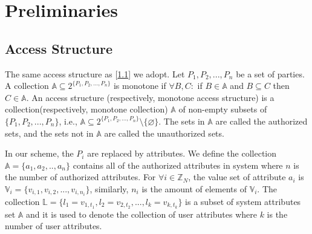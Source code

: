 \documentclass[smallextended]{svjour3}       %
\begin{document}
\section{Preliminaries}\label{section2}
\subsection{Access Structure}
	The same access structure as [\ref{}] we adopt. 
	Let ${P_1,P_2,...,P_n}$ be a set of parties.
	A collection $\mathbb{A}\subseteq 2^{\{P_1,P_2,...,P_n\}}$ is monotone if $\forall B,C:$ if $B\in \mathbb{A}$ and $B \subseteq C$ then $C \in \mathbb{A}$.
	An access structure (respectively, monotone access structure) is a collection(respectively, monotone collection) $\mathbb{A}$ of non-empty subsets of $\{P_1,P_2,...,P_n\}$, i.e., $\mathbb{A} \subseteq 2^{\{P_1,P_2,...,P_n\}}\setminus\{\varnothing \}$.
	The sets in $\mathbb{A}$ are called the authorized sets, and the sets not in $\mathbb{A}$ are called the unauthorized sets.

	In our scheme, the $P_i$ are replaced by attributes.
	We define the collection $\mathbb{A}=\{a_1,a_2,..,a_n\}$ contains all of the authorized attributes in system where $n$ is the number of authorized attributes. 
	For $\forall i \in \mathbb{Z}_N$, the value set of attribute $a_i$ is $\mathbb{V}_i=\{v_{i,1},v_{i,2},...,v_{i,n_i}\}$, similarly, $n_i$ is the amount of elements of $\mathbb{V}_i$.
	The collection $\mathbb{L}=\{l_1=v_{1,t_1},l_2=v_{2,t_2},...,l_k=v_{k,t_k}\}$ is a subset of system attributes set $\mathbb{A}$ and it is used to denote the collection of user attributes where $k$ is the number of user attributes.  
\end{document}
